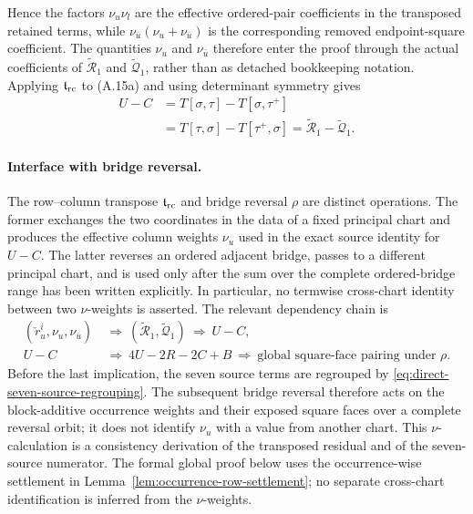 \documentclass[11pt]{article}
\begin{document}
Hence the factors $\nu_u\nu_l$ are the effective ordered-pair coefficients in
the transposed retained terms, while
$\nu_{\bar u}(\nu_u+\nu_{\bar u})$ is the corresponding removed
endpoint-square coefficient.  The quantities $\nu_u$ and $\nu_{\bar u}$
therefore enter the
proof through the actual coefficients of
$\widetilde{\mathcal R}_1$ and $\widetilde{\mathcal Q}_1$, rather than as
detached bookkeeping notation.
Applying $\mathfrak t_{\rm rc}$ to (A.15a) and using determinant symmetry
gives
\[
\begin{aligned}
U-C
&=T[\sigma,\tau]-T[\sigma,\tau^+]\\
&=T[\tau,\sigma]-T[\tau^+,\sigma]
 =\widetilde{\mathcal R}_1-\widetilde{\mathcal Q}_1.
\end{aligned}
\]

\paragraph{Interface with bridge reversal.}
The row--column transpose $\mathfrak t_{\rm rc}$ and bridge reversal $\rho$
are distinct operations.  The former exchanges the two coordinates in the
data of a fixed principal chart and produces the effective column weights
$\nu_u$ used in the exact source identity for $U-C$.  The latter reverses an
ordered adjacent bridge, passes to a different principal chart, and is used
only after the sum over the complete ordered-bridge range has been written
explicitly.  In
particular, no termwise cross-chart identity between two $\nu$-weights is
asserted.  The relevant dependency chain is
\[
\begin{aligned}
(\check r_u^i,\nu_u,\nu_{\bar u})
&\ \Longrightarrow\
(\widetilde{\mathcal R}_1,\widetilde{\mathcal Q}_1)
\ \Longrightarrow\ U-C,\\
U-C
&\ \Longrightarrow\ 4U-2R-2C+B
\ \Longrightarrow\
\text{global square-face pairing under }\rho .
\end{aligned}
\]
Before the last implication, the seven source terms are regrouped by
\eqref{eq:direct-seven-source-regrouping}.  The subsequent bridge reversal
therefore acts on the block-additive occurrence weights and their exposed
square faces over a complete reversal orbit; it does not identify $\nu_u$
with a value from another chart.
This $\nu$-calculation is a consistency derivation of the transposed residual
and of the seven-source numerator.  The formal global proof below uses the
occurrence-wise settlement in
Lemma~\ref{lem:occurrence-row-settlement}; no separate cross-chart
identification is inferred from the $\nu$-weights.
\end{document}
